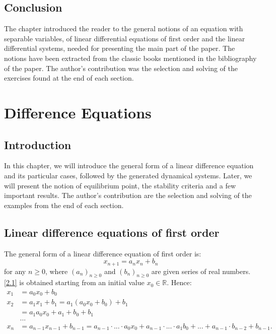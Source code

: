 \documentclass[a4paper, 11pt]{report}
\newcommand{\R}{\mathbb{R}}
\begin{document}
\section{Conclusion}
The chapter introduced the reader to the general notions of an equation with separable variables, of linear differential equations of first order and the linear differential systems, needed for presenting the main part of the paper. The notions have been extracted from the classic books mentioned in the bibliography of the paper. The author's contribution was the selection and solving of the exercises found at the end of each section.

    
    
    \chapter{Difference Equations}
    \section{Introduction}
    In this chapter, we will introduce the general form of a linear difference equation and its particular cases, followed by the generated dynamical systems. Later, we will present the notion of equilibrium point, the stability criteria and a few important results. The author's contribution are the selection and solving of the examples from the end of each section.
    \section{Linear difference equations of first order}
    The general form of a linear difference equation of first order is:
    \begin{equation} 
     x_{n+1}=a_{n}x_{n}+b_{n} \label{2.1}
    \end{equation}
    for any $n \geq 0$, where $(a_{n})_{n\geq 0}$ and $(b_{n})_{n\geq 0}$ are given series of real numbers. 
\eqref{2.1} is obtained starting from an initial value $x_{0} \in \R$. Hence:
\begin{align*}
 x_{1} & =a_{0}x_{0}+b_{0}\\
   x_{2} & =a_{1}x_{1}+b_{1} = a_{1}(a_{0}x_{0}+b_{0})+b_{1}\\
  & = a_{1}a_{0}x_{0}+a_{1}+b_{0}+b_{1}\\
  & ...\\
   x_{n}&=a_{n-1}x_{n-1}+b_{n-1} = a_{n-1}\cdot ... \cdot a_{0}x_{0}+a_{n-1}\cdot ...\cdot a_{1}b_{0}+...+a_{n-1}\cdot b_{n-2}+b_{n-1}.
\end{align*}
\end{document}

